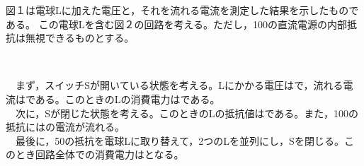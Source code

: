 \hakosyokika
\item 図１は電球Lに加えた電圧と，それを流れる電流を測定した結果を示したものである。
    この電球Lを含む図２の回路を考える。ただし，100の直流電源の内部抵抗は無視できるものとする。
    \begin{center}
        ~~~~~~~~~~
        
    \end{center}
    ~~まず，スイッチSが開いている状態を考える。Lにかかる電圧は\Hako {}で，流れる電流は\Hako {}である。このときのLの消費電力は\Hako {}である。\\
    ~~次に，Sが閉じた状態を考える。このときのLの抵抗値は\Hako \tanni{\Omega }である。また，100\sftanni{\Omega }の抵抗には\Hako {}の電流が流れる。\\
    ~~最後に，50\sftanni{\Omega }の抵抗を電球Lに取り替えて，2つのLを並列にし，Sを閉じる。このとき回路全体での消費電力は\Hako {}となる。
